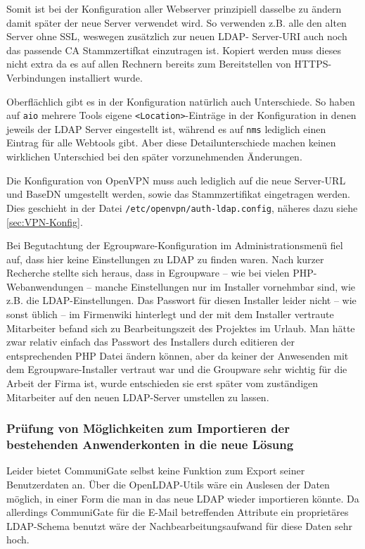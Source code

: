 \documentclass[11pt,a4paper,titlepage=firstiscover,headsepline,bibtotoc]{scrartcl} %
\begin{document}
Somit ist bei der Konfiguration aller Webserver prinzipiell dasselbe zu ändern damit später der neue Server verwendet wird. So verwenden z.B. alle den alten Server ohne SSL, weswegen zusätzlich zur neuen LDAP- Server-URI auch noch das passende CA Stammzertifkat einzutragen ist. Kopiert werden muss dieses nicht extra da es auf allen Rechnern bereits zum Bereitstellen von HTTPS-Verbindungen installiert wurde. 

Oberflächlich gibt es in der Konfiguration natürlich auch Unterschiede. So haben auf \texttt{aio} mehrere Tools eigene \texttt{<Location>}-Einträge in der Konfiguration in denen jeweils der LDAP Server eingestellt ist, während es auf \texttt{nms} lediglich einen Eintrag für alle Webtools gibt. Aber diese Detailunterschiede machen keinen wirklichen Unterschied bei den später vorzunehmenden Änderungen.

Die Konfiguration von OpenVPN muss auch lediglich auf die neue Server-URL und BaseDN umgestellt werden, sowie das Stammzertifikat eingetragen werden. Dies geschieht in der Datei \texttt{/etc/openvpn/auth-ldap.config}, näheres dazu siehe \autoref{sec:VPN-Konfig}.

Bei Begutachtung der Egroupware-Konfiguration im Administrationsmenü fiel auf, dass hier keine Einstellungen zu LDAP zu finden waren. Nach kurzer Recherche stellte sich heraus, dass in Egroupware -- wie bei vielen PHP-Webanwendungen -- manche Einstellungen nur im Installer vornehmbar sind, wie z.B. die LDAP-Einstellungen. Das Passwort für diesen Installer leider nicht -- wie sonst üblich -- im Firmenwiki hinterlegt und der mit dem Installer vertraute Mitarbeiter befand sich zu Bearbeitungszeit des Projektes im Urlaub. Man hätte zwar relativ einfach das Passwort des Installers durch editieren der entsprechenden PHP Datei ändern können, aber da keiner der Anwesenden mit dem Egroupware-Installer vertraut war und die Groupware sehr wichtig für die Arbeit der Firma ist, wurde entschieden sie erst später vom zuständigen Mitarbeiter auf den neuen LDAP-Server umstellen zu lassen. 

\subsubsection{Prüfung von Möglichkeiten zum Importieren der bestehenden Anwenderkonten in die neue Lösung} \label{sec:Importsuche}
Leider bietet CommuniGate selbst keine Funktion zum Export seiner Benutzerdaten an. Über die OpenLDAP-Utils wäre ein Auslesen der Daten möglich, in einer Form die man in das neue LDAP wieder importieren könnte. Da allerdings CommuniGate für die E-Mail betreffenden Attribute ein proprietäres LDAP-Schema benutzt wäre der Nachbearbeitungsaufwand für diese Daten sehr hoch. 
\end{document}
